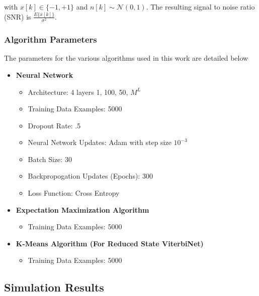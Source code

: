 \documentclass[12pt,a4paper]{report}
\begin{document}
with $x[k] \in \{ -1, +1\}$ and $n[k]  \sim \mathcal{N}(0,1)$.  
The resulting signal to noise ratio (SNR) is 
$\frac{E\{x[k]\}}{\sigma^2}$.


\subsubsection{Algorithm Parameters}
The parameters for the various algorithms used in this work are detailed below
\begin{itemize}
\item \textbf{Neural Network}
\begin{itemize}
\item Architecture: 4 layers {1, 100, 50, $M^L$}
\item Training Data Examples: 5000
\item Dropout Rate: .5
\item Neural Network Updates: Adam with step size $10^{-3}$ \cite{kingma2014adam}
\item Batch Size: 30 
\item Backpropogation Updates (Epochs): 300
\item Loss Function: Cross Entropy
\end{itemize}
\item \textbf{Expectation Maximization Algorithm}
\begin{itemize}
\item Training Data Examples: 5000
\end{itemize}
\item \textbf{K-Means Algorithm (For Reduced State ViterbiNet)}
\begin{itemize}
\item Training Data Examples: 5000
\end{itemize}
\end{itemize}


\subsection{Simulation Results}
\end{document}
